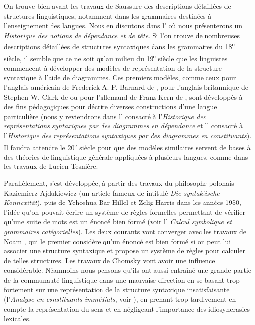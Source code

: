 {    On trouve bien avant les travaux de Saussure des descriptions détaillées de structures linguistiques, notamment dans les grammaires destinées à l’enseignement des langues. Nous en discutons dans l’ où nous présenterons un \textit{Historique des notions de dépendance et de tête}. Si l’on trouve de nombreuses descriptions détaillées de structures syntaxiques dans les grammaires du 18\textsuperscript{e} siècle, il semble que ce ne soit qu’au milieu du 19\textsuperscript{e} siècle que les linguistes commencent à développer des modèles de représentation de la structure syntaxique à l’aide de diagrammes. Ces premiers modèles, comme ceux pour l’anglais américain de Frederick A. P. Barnard de \citeyear{barnard1836analytic}, pour l’anglais britannique de Stephen W. Clark de \citeyear{Clark1847} ou pour l’allemand de Franz Kern de \citeyear{kern1883zur}, sont développés à des fins pédagogiques pour décrire diverses constructions d’une langue particulière (nous y reviendrons dans l’ consacré à l’\textit{Historique des représentations syntaxiques par des diagrammes en dépendance} et l’ consacré à l’\textit{Historique des représentations syntaxiques par des diagrammes en constituants}). Il faudra attendre le 20\textsuperscript{e} siècle pour que des modèles similaires servent de bases à des théories de linguistique générale appliquées à plusieurs langues, comme dans les travaux de Lucien Tesnière.

    Parallèlement, s’est développée, à partir des travaux du philosophe polonais Kaziemierz Ajdukiewicz (un article fameux de \citeyear{ajduckiewicz1935syntaktische} intitulé \textit{Die syntaktische Konnexität}), puis de Yehoshua Bar-Hillel et Zelig Harris dans les années 1950, l’idée qu’on pouvait écrire un système de règles formelles permettant de vérifier qu’une suite de mots est un énoncé bien formé (voir l’ \textit{Calcul symbolique et grammaires catégorielles}). Les deux courants vont converger avec les travaux de Noam \citet{chomsky1957syntactic}, qui le premier considère qu’un énoncé est bien formé si on peut lui associer une structure syntaxique et propose un système de règles pour calculer de telles structures. Les travaux de Chomsky vont avoir une influence considérable. Néanmoins nous pensons qu’ils ont aussi entraîné une grande partie de la communauté linguistique dans une mauvaise direction en se basant trop fortement sur une représentation de la structure syntaxique insatisfaisante (l’\textit{Analyse en constituants immédiats}, voir ), en prenant trop tardivement en compte la représentation du sens et en négligeant l’importance des idiosyncrasies lexicales.
}
